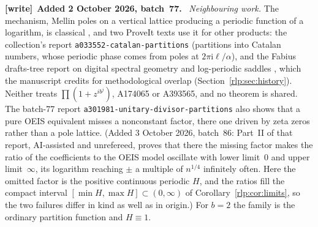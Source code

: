 \documentclass[11pt,letterpaper]{article}
\numberwithin{equation}{section}
\theoremstyle{remark}\newtheorem{remark}[theorem]{Remark}
\newcommand{\ii}{\mathrm i}
\newenvironment{writenote}[1][]{\par\smallskip\begingroup\small
 \noindent\textbf{[write]}\if\relax\detokenize{#1}\relax\else~\textbf{#1.}\fi\ }%
 {\par\endgroup\smallskip}
\begin{document}
\begin{writenote}[Added 2 October 2026, batch~77]
\emph{Neighbouring work.} The mechanism, Mellin poles on a vertical lattice
producing a periodic function of a logarithm, is classical
\cite{mellin,madritsch}, and two ProveIt texts use it for other products:
the collection's report \texttt{a033552-\allowbreak catalan-\allowbreak partitions}
\cite{rlp-a033552} (partitions into Catalan numbers, whose periodic phase
comes from poles at $2\pi\ii\ell/\alpha$), and the Fabius drafts-tree report
on digital spectral geometry and log-periodic saddles \cite{rlp-fabius},
which the manuscript credits for methodological overlap (Section~\ref{rlp:sec:history}).
Neither treats $\prod(1+z^{ib^j})$, A174065 or A393565, and no theorem is
shared. The batch-77 report \texttt{a301981-\allowbreak unitary-\allowbreak divisor-\allowbreak partitions}
also shows that a pure OEIS equivalent misses a nonconstant factor, there
one driven by zeta zeros rather than a pole lattice. (Added 3 October 2026,
batch~86: Part~II of that report, AI-assisted and unrefereed, proves that
there the missing factor makes the ratio of the coefficients to the OEIS
model oscillate with lower limit~$0$ and upper limit~$\infty$, its logarithm
reaching $\pm$ a multiple of $n^{1/4}$ infinitely often. Here the omitted
factor is the positive continuous periodic $H$, and the ratios fill the
compact interval $[\min H,\max H]\subset(0,\infty)$ of
Corollary~\ref{rlp:cor:limits}, so the two failures differ in kind as well
as in origin.) For $b=2$ the family is
the ordinary partition function and $H\equiv1$.


\end{writenote}
\end{document}
